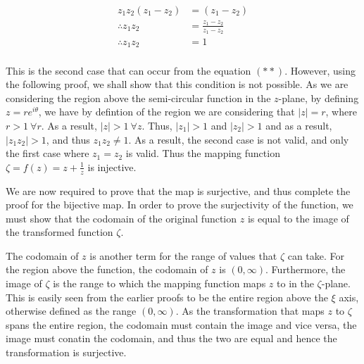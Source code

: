 \documentclass[a4paper]{article}
\begin{document}
\begin{enumerate}[label=\textbf{\arabic*.}]
\begin{enumerate}
\begin{enumerate}
			\begin{align*}
			z_1z_2(z_1 - z_2) & = (z_1 - z_2)\\
			\therefore z_1z_2 & = \frac{z_1 - z_2}{z_1 - z_2}\\
			\therefore z_1z_2 & = 1\\
			\end{align*}

			This is the second case that can occur from the equation $\displaystyle{(**)}$. However, using the following proof, we shall show that this condition is not possible. As we are considering the region above the semi-circular function in the $\displaystyle{z}$-plane, by defining $\displaystyle{z=re^{i\theta}}$, we have by defintion of the region we are considering that $\displaystyle{|z|=r}$, where $\displaystyle{r>1\:\forall r}$. As a result, $\displaystyle{|z| > 1 \: \forall z}$. Thus, $\displaystyle{|z_1|>1}$ and $\displaystyle{|z_2|>1}$ and as a result, $\displaystyle{|z_1z_2|>1}$, and thus $\displaystyle{z_1z_2 \neq 1}$. As a result, the second case is not valid, and only the first case where $\displaystyle{z_1 = z_2}$ is valid. Thus the mapping function $\displaystyle{\zeta = f(z) = z + \frac{1}{z}}$ is injective.

			\bigbreak

			We are now required to prove that the map is surjective, and thus complete the proof for the bijective map. In order to prove the surjectivity of the function, we must show that the codomain of the original function $\displaystyle{z}$ is equal to the image of the transformed function $\displaystyle{\zeta}$. 

			\bigbreak

			The codomain of $\displaystyle{z}$ is another term for the range of values that $\displaystyle{\zeta}$ can take. For the region above the function, the codomain of $\displaystyle{z}$ is $\displaystyle{(0,\infty)}$. Furthermore, the image of $\displaystyle{\zeta}$ is the range to which the mapping function maps $\displaystyle{z}$ to in the $\displaystyle{\zeta}$-plane. This is easily seen from the earlier proofs to be the entire region above the $\displaystyle{\xi}$ axis, otherwise defined as the range $\displaystyle{(0,\infty)}$. As the transformation that maps $\displaystyle{z}$ to $\displaystyle{\zeta}$ spans the entire region, the codomain must contain the image and vice versa, the image must conatin the codomain, and thus the two are equal and hence the transformation is surjective.

			\bigbreak


\end{enumerate}
\end{enumerate}
\end{enumerate}
\end{document}
